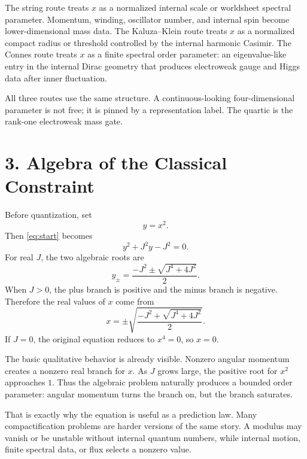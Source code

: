 \documentclass[11pt]{article}
\begin{document}
The string route treats \(x\) as a normalized internal scale or worldsheet spectral parameter. Momentum, winding, oscillator number, and internal spin become lower-dimensional mass data. The Kaluza--Klein route treats \(x\) as a normalized compact radius or threshold controlled by the internal harmonic Casimir. The Connes route treats \(x\) as a finite spectral order parameter: an eigenvalue-like entry in the internal Dirac geometry that produces electroweak gauge and Higgs data after inner fluctuation.

All three routes use the same structure. A continuous-looking four-dimensional parameter is not free; it is pinned by a representation label. The quartic is the rank-one electroweak mass gate.


\section*{3. Algebra of the Classical Constraint}

Before quantization, set
\[
        y=x^2 .
\]
Then \eqref{eq:start} becomes
\begin{equation}
        y^2+J^2y-J^2=0 .
        \label{eq:yclassical}
\end{equation}
For real \(J\), the two algebraic roots are
\begin{equation}
        y_{\pm}=\frac{-J^2\pm \sqrt{J^4+4J^2}}{2}.
\end{equation}
When \(J>0\), the plus branch is positive and the minus branch is negative. Therefore the real values of \(x\) come from
\begin{equation}
        x=\pm \sqrt{\frac{-J^2+\sqrt{J^4+4J^2}}{2}} .
        \label{eq:xclassical}
\end{equation}
If \(J=0\), the original equation reduces to \(x^4=0\), so \(x=0\).

The basic qualitative behavior is already visible. Nonzero angular momentum creates a nonzero real branch for \(x\). As \(J\) grows large, the positive root for \(x^2\) approaches \(1\). Thus the algebraic problem naturally produces a bounded order parameter: angular momentum turns the branch on, but the branch saturates.

That is exactly why the equation is useful as a prediction law. Many compactification problems are harder versions of the same story. A modulus may vanish or be unstable without internal quantum numbers, while internal motion, finite spectral data, or flux selects a nonzero value.
\end{document}
